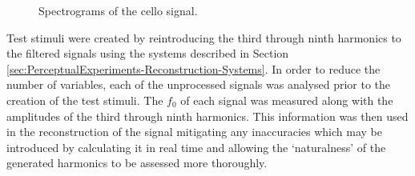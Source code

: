 			\begin{figure}[h!]
				\centering
				\quad
				\caption{Spectrograms of the cello signal.}
				\label{fig:CelloSpectrograms}
			\end{figure}

			Test stimuli were created by reintroducing the third through ninth harmonics to the filtered
			signals using the systems described in Section
			\ref{sec:PerceptualExperiments-Reconstruction-Systems}. In order to reduce the number of variables,
			each of the unprocessed signals was analysed prior to the creation of the test stimuli. The $f_{0}$
			of each signal was measured along with the amplitudes of the third through ninth harmonics. This
			information was then used in the reconstruction of the signal mitigating any inaccuracies which may
			be introduced by calculating it in real time and allowing the `naturalness' of the generated
			harmonics to be assessed more thoroughly.

